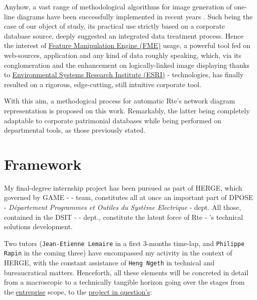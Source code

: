 Anyhow, a vast range of methodological algorithms for image generation of one-line diagrams have been successfully implemented in recent years \cite{Distribution-feeder,standard-based-SLD-AG,AlgoAIG}. Such being the case of our object of study, its practical use strictly based on a corporate database source, deeply suggested an integrated data treatment process. Hence the interest of \href{https://www.safe.com/how-it-works/}{Feature Manipulation Engine (FME)} usage, a powerful tool fed on web-sources, application and any kind of data roughly speaking, which, via its conglomeration and the enhancement on logically-linked image displaying thanks to \href{http://www.esri.com/}{Environmental Systems Research Institute (ESRI)} -  technologies, has finally resulted on a rigorous, edge-cutting, still intuitive corporate tool. 

With this aim, a methodogical process for automatic Rte's network diagram representation is proposed on this work. Remarkably, the latter being completely adaptable to corporate patrimonial databases while being performed on departmental  tools, as those previously stated. 
\section{Framework}
\label{sec:Intro:framework}

My final-degree internship project has been pursued as part of HERGE, which governed by GAME -  - team, constitutes all at once an important part of DPOSE - \textit{Département Programmes et Outiles du Système Electrique} - dept. All those, contained in the DSIT -  - dept., constitute the latent force of Rte - 's technical solutions development. 

Two tutors (\texttt{Jean-Etienne Lemaire} in a first 3-months time-lap, and \texttt{Philippe Rapin} in the coming three) have encompassed my activity in the context of HERGE, with the constant assistance of \texttt{Heng Ngeth} in technical and bureaucratical matters. 
Henceforth, all these elements will be concreted in detail from a macroscopic to a technically tangible horizon going over the stages from the \hyperref[sec:Intro:Rte]{entreprise} scope, to the \hyperref[sec:Intro:thesis-purpose:HERGE]{project in question's}: 


